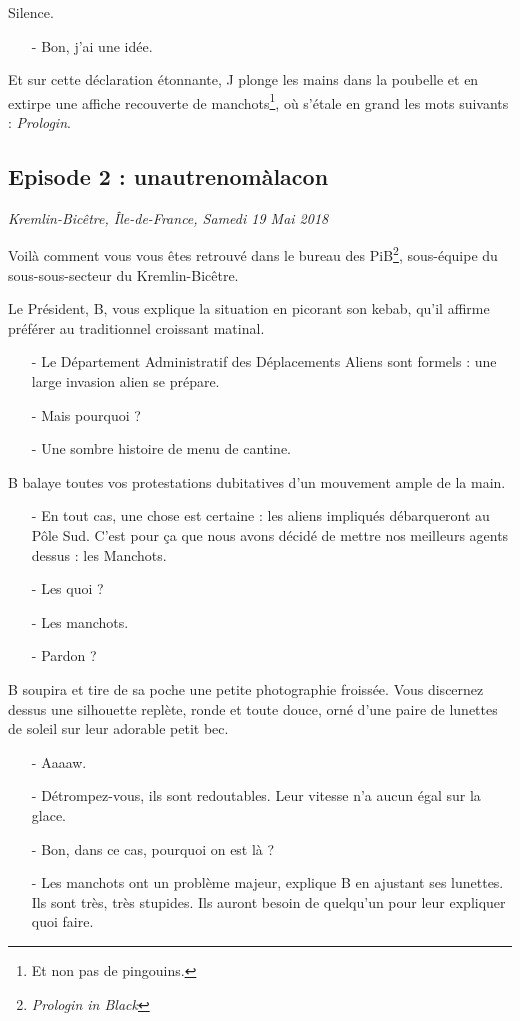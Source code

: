 Silence.

\begin{itemize}
\item[-] Bon, j'ai une idée.
\end{itemize}

Et sur cette déclaration étonnante, J plonge les mains dans la poubelle et en
extirpe une affiche recouverte de manchots\footnote{Et non pas de pingouins.},
où s'étale en grand les mots suivants : \emph{Prologin}.

\subsection{Episode 2 : unautrenomàlacon}
\hfill \textit{Kremlin-Bicêtre, Île-de-France, Samedi 19 Mai 2018}

Voilà comment vous vous êtes retrouvé dans le bureau des
PiB\footnote{\emph{Prologin in Black}\texttrademark}, sous-équipe du
sous-sous-secteur du Kremlin-Bicêtre.

Le Président, B, vous explique la situation en picorant son kebab, qu'il affirme
préférer au traditionnel croissant matinal.

\begin{itemize}
    \item[-] Le Département Administratif des Déplacements Aliens sont formels :
        une large invasion alien se prépare.
    \item[-] Mais pourquoi ?
    \item[-] Une sombre histoire de menu de cantine. %
\end{itemize}
B balaye toutes vos protestations dubitatives d'un mouvement ample de la main.
\begin{itemize}
    \item[-] En tout cas, une chose est certaine : les aliens impliqués
        débarqueront au Pôle Sud. C'est pour ça que nous avons décidé de mettre
        nos meilleurs agents dessus : les Manchots.
    \item[-] Les quoi ?
    \item[-] Les manchots.
    \item[-] Pardon ?
\end{itemize}

B soupira et tire de sa poche une petite photographie froissée. Vous discernez
dessus une silhouette replète, ronde et toute douce, orné d'une paire de
lunettes de soleil sur leur adorable petit bec.

\begin{itemize}
    \item[-] Aaaaw.
    \item[-] Détrompez-vous, ils sont redoutables. Leur vitesse n'a aucun égal
        sur la glace.
    \item[-] Bon, dans ce cas, pourquoi on est là ?
    \item[-] Les manchots ont un problème majeur, explique B en ajustant ses
        lunettes. Ils sont très, très stupides. Ils auront besoin de quelqu'un
        pour leur expliquer quoi faire.
\end{itemize}

